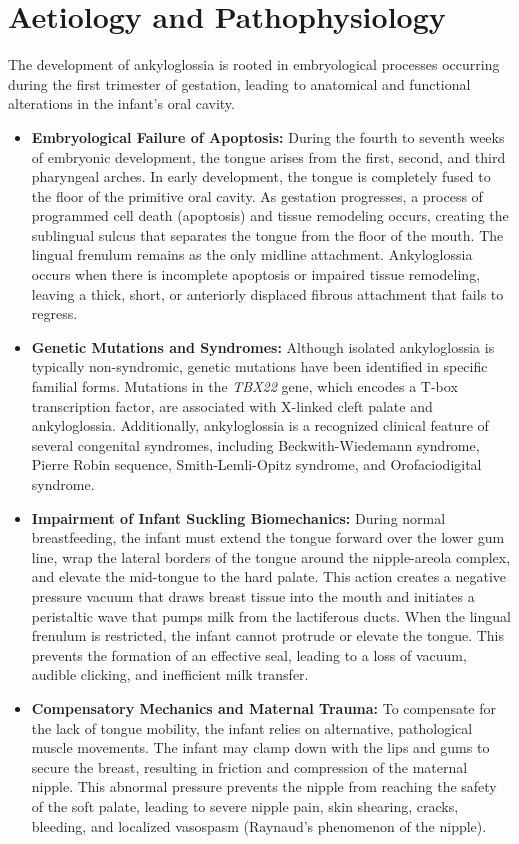 \section*{Aetiology and Pathophysiology}
The development of ankyloglossia is rooted in embryological processes occurring during the first trimester of gestation, leading to anatomical and functional alterations in the infant's oral cavity.
\begin{itemize}
  \item \textbf{Embryological Failure of Apoptosis:} During the fourth to seventh weeks of embryonic development, the tongue arises from the first, second, and third pharyngeal arches. In early development, the tongue is completely fused to the floor of the primitive oral cavity. As gestation progresses, a process of programmed cell death (apoptosis) and tissue remodeling occurs, creating the sublingual sulcus that separates the tongue from the floor of the mouth. The lingual frenulum remains as the only midline attachment. Ankyloglossia occurs when there is incomplete apoptosis or impaired tissue remodeling, leaving a thick, short, or anteriorly displaced fibrous attachment that fails to regress.
  \item \textbf{Genetic Mutations and Syndromes:} Although isolated ankyloglossia is typically non-syndromic, genetic mutations have been identified in specific familial forms. Mutations in the \textit{TBX22} gene, which encodes a T-box transcription factor, are associated with X-linked cleft palate and ankyloglossia. Additionally, ankyloglossia is a recognized clinical feature of several congenital syndromes, including Beckwith-Wiedemann syndrome, Pierre Robin sequence, Smith-Lemli-Opitz syndrome, and Orofaciodigital syndrome.
  \item \textbf{Impairment of Infant Suckling Biomechanics:} During normal breastfeeding, the infant must extend the tongue forward over the lower gum line, wrap the lateral borders of the tongue around the nipple-areola complex, and elevate the mid-tongue to the hard palate. This action creates a negative pressure vacuum that draws breast tissue into the mouth and initiates a peristaltic wave that pumps milk from the lactiferous ducts. When the lingual frenulum is restricted, the infant cannot protrude or elevate the tongue. This prevents the formation of an effective seal, leading to a loss of vacuum, audible clicking, and inefficient milk transfer.
  \item \textbf{Compensatory Mechanics and Maternal Trauma:} To compensate for the lack of tongue mobility, the infant relies on alternative, pathological muscle movements. The infant may clamp down with the lips and gums to secure the breast, resulting in friction and compression of the maternal nipple. This abnormal pressure prevents the nipple from reaching the safety of the soft palate, leading to severe nipple pain, skin shearing, cracks, bleeding, and localized vasospasm (Raynaud's phenomenon of the nipple).

\end{itemize}
